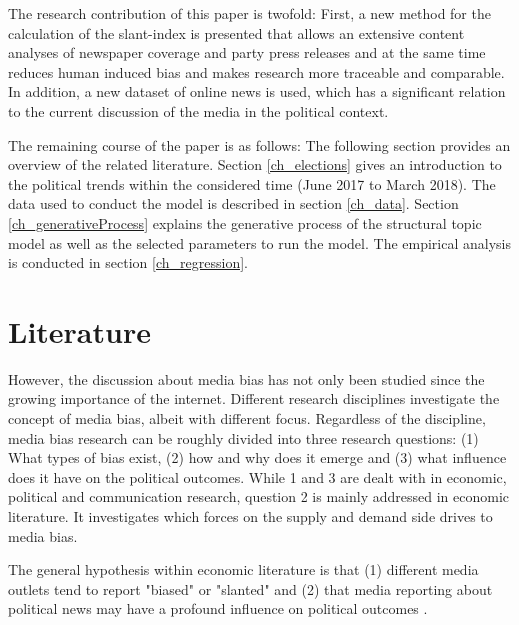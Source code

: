 \documentclass[12pt,a4paper,notitlepage]{article}
\begin{document}
The research contribution of this paper is twofold: First, a new method for the calculation of the slant-index is presented that allows an extensive content analyses of newspaper coverage and party press releases and at the same time reduces human induced bias and makes research more traceable and comparable. In addition, a new dataset of online news is used, which has a significant relation to the current discussion of the media in the political context. 

The remaining course of the paper is as follows: The following section provides an overview of the related literature. Section \ref{ch_elections} gives an introduction to the political trends within the considered time (June 2017 to March 2018). The data used to conduct the model is described in section \ref{ch_data}. Section \ref{ch_generativeProcess} explains the generative process of the structural topic model as well as the selected parameters to run the model. The empirical analysis is conducted in section \ref{ch_regression}. 


\section{Literature}

However, the discussion about media bias has not only been studied since the growing importance of the internet. Different research disciplines investigate the concept of media bias, albeit with different focus. Regardless of the discipline, media bias research can be roughly divided into three research questions: (1) What types of bias exist, (2) how and why does it emerge and (3) what influence does it have on the political outcomes. While 1 and 3 are dealt with in economic, political and communication research, question 2 is mainly addressed in economic literature. It investigates which forces on the supply and demand side drives to media bias.  

The general hypothesis within economic literature is that (1) different media outlets tend to report "biased" or "slanted" \citep{groseclose_measure_2005, lott_is_2014} and (2) that media reporting about political news may have a profound influence on political outcomes \citep{gentzkow_media_2004, stromberg_radios_2004, dellavigna_fox_2006, snyder_press_2010, gentzkow_television_2006}. 
\end{document}
